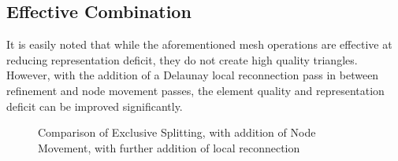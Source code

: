 \subsection{Effective Combination}
It is easily noted that while the aforementioned mesh operations are
effective at reducing representation deficit, they do not create high
quality triangles. However, with the addition of a Delaunay local
reconnection pass in between refinement and node movement passes, the
element quality and representation deficit can be improved
significantly.

\begin{figure}[h!]
  \begin{center}
  \caption{Comparison of Exclusive Splitting, with addition of Node
Movement, with further addition of local reconnection}
  \label{fig_Combo}
  \end{center}
\end{figure}

